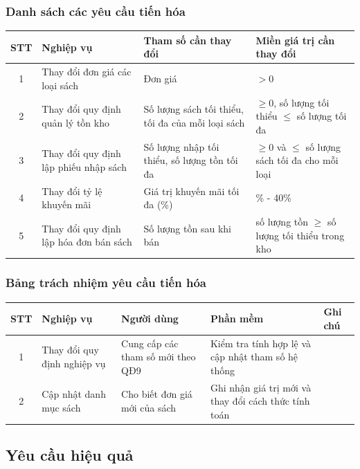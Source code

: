 \documentclass[12pt]{report}
\begin{document}
            \subsubsection{Danh sách các yêu cầu tiến hóa}
                \begin{tabularx}{\textwidth}{|c|>{\RaggedRight}X|>{\RaggedRight}X|>{\RaggedRight}X|}
                    \hline
                    \textbf{STT} & \textbf{Nghiệp vụ} & 
                    \textbf{Tham số cần thay đổi} & \textbf{Miền giá trị cần thay đổi} \\ \hline
                    1 & Thay đổi đơn giá các loại sách & Đơn giá & $> 0$ \\ \hline
                    2 & Thay đổi quy định quản lý tồn kho & Số lượng sách tối thiểu, tối đa của mỗi loại sách & $\ge 0$, số lượng tối thiểu $\le$ số lượng tối đa \\ \hline
                    3 & Thay đổi quy định lập phiếu nhập sách & Số lượng nhập tối thiểu, số lượng tồn tối đa & $\ge 0$ và $\le$ số lượng sách tối đa cho mỗi loại \\ \hline
                    4 & Thay đổi tỷ lệ khuyến mãi & Giá trị khuyến mãi tối đa (\%) & 0\% - 40\% \\ \hline
                    5 & Thay đổi quy định lập hóa đơn bán sách & Số lượng tồn sau khi bán & số lượng tồn $\ge$ số lượng tối thiểu trong kho \\ \hline
                \end{tabularx}
            \subsubsection{Bảng trách nhiệm yêu cầu tiến hóa}
                \begin{tabularx}{\textwidth}{|c|>{\RaggedRight}X|>{\RaggedRight}X|>{\RaggedRight}X|l|}
                    \hline
                    \textbf{STT} & \textbf{Nghiệp vụ} & 
                    \textbf{Người dùng} & \textbf{Phần mềm} & 
                    \textbf{Ghi chú} \\ \hline
                    1 & Thay đổi quy định nghiệp vụ & Cung cấp các tham số mới theo QĐ9 & Kiểm tra tính hợp lệ và cập nhật tham số hệ thống & \\ \hline
                    2 & Cập nhật danh mục sách & Cho biết đơn giá mới của sách & Ghi nhận giá trị mới và thay đổi cách thức tính toán & \\ \hline
                \end{tabularx}
        \subsection{Yêu cầu hiệu quả}
\end{document}
